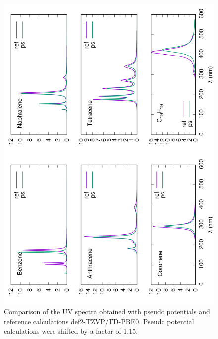 \documentclass[12pt]{article}
\begin{document}
\begin{figure}
\begin{center}
\includegraphics[width=12cm,angle=270]{cnhn_uv}
\end{center}
\vspace{0.25in}
\hspace*{3in}
\caption{Comparison of the UV spectra obtained with pseudo potentials and reference
calculations def2-TZVP/TD-PBE0.
Pseudo potential calculations were shifted by a factor of 1.15.}
\label{fig:cnhn_uv}
\end{figure}

\end{document}
